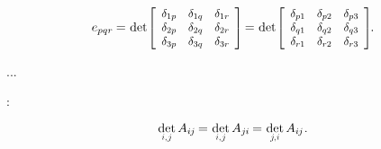 \nopagebreak\vspace{-0.1em}
\begin{equation}\label{permutationsymbolasdeterminant}
e_{pqr} \hspace{-0.1ex}
= \hspace{.1ex}
\operatorname{det}\hspace{-0.25ex} \scalebox{.92}{$\left[ \begin{array}{ccc}
\delta_{1p} & \delta_{1q} & \delta_{1r} \\
\delta_{2p} & \delta_{2q} & \delta_{2r} \\
\delta_{3p} & \delta_{3q} & \delta_{3r}
\end{array} \hspace{-0.1ex} \right]$} \hspace{-0.2ex}
= \hspace{.1ex}
\operatorname{det}\hspace{-0.25ex} \scalebox{.92}{$\left[ \begin{array}{ccc}
\delta_{p1} & \delta_{p2} & \delta_{p3} \\
\delta_{q1} & \delta_{q2} & \delta_{q3} \\
\delta_{r1} & \delta_{r2} & \delta_{r3}
\end{array} \hspace{-0.1ex} \right]$}
\hspace{-0.2ex} .
\end{equation}

...

 :

\nopagebreak\vspace{-0.25em}\begin{equation*}
\underset{\raisebox{.15em}{\scalebox{.7}{$i$,$\hspace{.15ex}j$}}}{\operatorname{det}} \, A_{i\hspace{-0.1ex}j} \hspace{-0.16ex}
= \hspace{.1ex} \underset{\raisebox{.15em}{\scalebox{.7}{$i$,$\hspace{.15ex}j$}}}{\operatorname{det}} \, A_{j\hspace{-0.06ex}i} \hspace{-0.16ex}
= \hspace{.1ex} \underset{\raisebox{.15em}{\scalebox{.7}{$j\hspace{-0.2ex}$,$\hspace{.1ex}i$}}}{\operatorname{det}} \, A_{i\hspace{-0.1ex}j}
\hspace{.1ex} .
\end{equation*}

